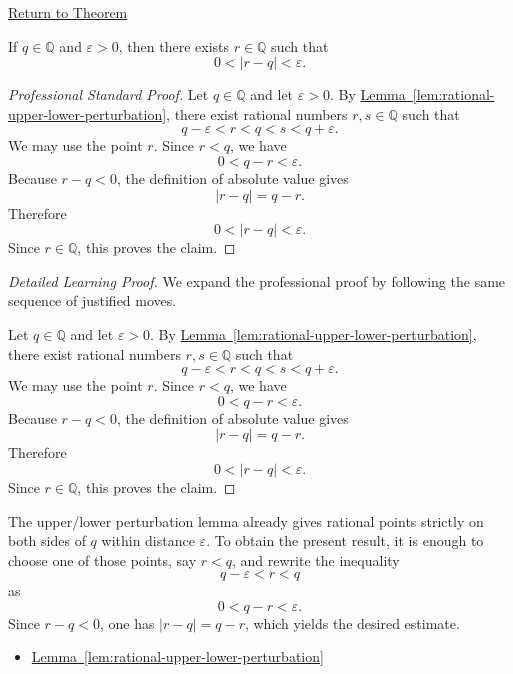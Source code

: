 \newpage
{}
\label{prf:rational-perturbation-lemma}

\begin{remark*}[Return]
\hyperref[lem:rational-perturbation-lemma]{Return to Theorem}
\end{remark*}

\begin{lemma*}
If $q\in\mathbb{Q}$ and $\varepsilon>0$, then there exists $r\in\mathbb{Q}$
such that
\[
0<|r-q|<\varepsilon.
\]
\end{lemma*}

\begin{proof}[Professional Standard Proof]
\LRAProofBodyStart
Let $q\in\mathbb{Q}$ and let $\varepsilon>0$. By
\hyperref[lem:rational-upper-lower-perturbation]{Lemma~\ref*{lem:rational-upper-lower-perturbation}},
there exist rational numbers $r,s\in\mathbb{Q}$ such that
\[
q-\varepsilon<r<q<s<q+\varepsilon.
\]
We may use the point $r$. Since $r<q$, we have
\[
0<q-r<\varepsilon.
\]
Because $r-q<0$, the definition of absolute value gives
\[
|r-q|=q-r.
\]
Therefore
\[
0<|r-q|<\varepsilon.
\]
Since $r\in\mathbb{Q}$, this proves the claim.
\end{proof}

\begin{proof}[Detailed Learning Proof]
\LRAProofBodyStart
We expand the professional proof by following the same sequence of justified moves.

Let $q\in\mathbb{Q}$ and let $\varepsilon>0$. By
\hyperref[lem:rational-upper-lower-perturbation]{Lemma~\ref*{lem:rational-upper-lower-perturbation}},
there exist rational numbers $r,s\in\mathbb{Q}$ such that
\[
q-\varepsilon<r<q<s<q+\varepsilon.
\]
We may use the point $r$. Since $r<q$, we have
\[
0<q-r<\varepsilon.
\]
Because $r-q<0$, the definition of absolute value gives
\[
|r-q|=q-r.
\]
Therefore
\[
0<|r-q|<\varepsilon.
\]
Since $r\in\mathbb{Q}$, this proves the claim.
\end{proof}

\begin{remark*}
The upper/lower perturbation lemma already gives rational points strictly on
both sides of $q$ within distance $\varepsilon$. To obtain the present result,
it is enough to choose one of those points, say $r<q$, and rewrite the
inequality
\[
q-\varepsilon<r<q
\]
as
\[
0<q-r<\varepsilon.
\]
Since $r-q<0$, one has $|r-q|=q-r$, which yields the desired estimate.
\end{remark*}

\begin{dependencies}
\begin{itemize}
  \item \hyperref[lem:rational-upper-lower-perturbation]{Lemma~\ref*{lem:rational-upper-lower-perturbation}}
\end{itemize}
\end{dependencies}


\clearpage
